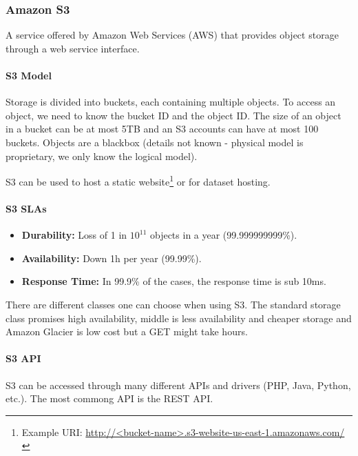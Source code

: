 



\subsubsection{Amazon S3}

A service offered by Amazon Web Services (AWS) that provides object storage through a web service interface. 

\paragraph{S3 Model}
Storage is divided into buckets, each containing multiple objects. To access an object, we need to know the bucket ID and the object ID. The size of an object in a bucket can be at most 5TB and an S3 accounts can have at most 100 buckets. Objects are a blackbox (details not known - physical model is proprietary, we only know the logical model).

S3 can be used to host a static website\footnote{Example URI: \url{http://<bucket-name>.s3-website-us-east-1.amazonaws.com/}} or for dataset hosting.

\paragraph{S3 SLAs}
\begin{itemize}
    \item \textbf{Durability:} Loss of 1 in $10^{11}$ objects in a year (99.999999999\%).
    \item \textbf{Availability:} Down 1h per year (99.99\%).
    \item \textbf{Response Time:} In 99.9\% of the cases, the response time is sub 10ms.
\end{itemize}
There are different classes one can choose when using S3. The standard storage class promises high availability, middle is less availability and cheaper storage and Amazon Glacier is low cost but a GET might take hours.


\paragraph{S3 API}
S3 can be accessed through many different APIs and drivers (PHP, Java, Python, etc.). The most commong API is the REST API.

